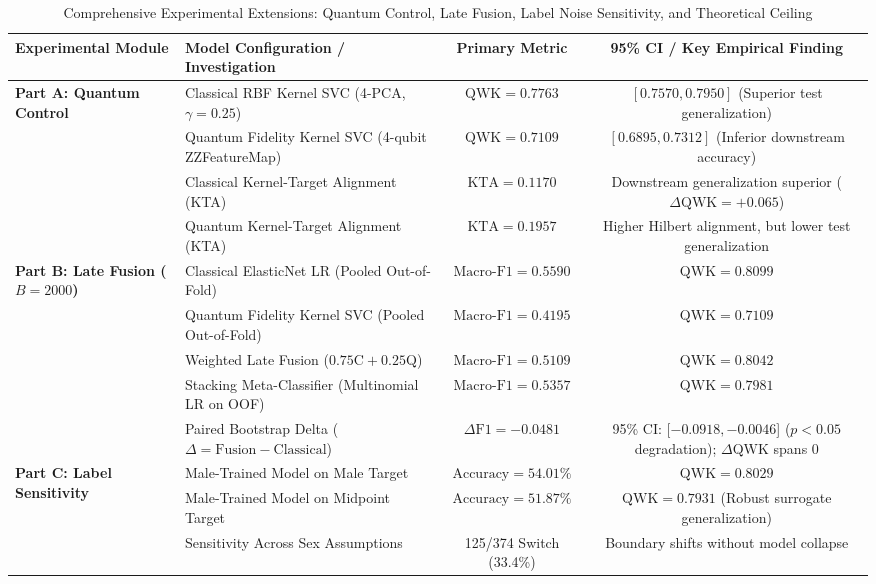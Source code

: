 \documentclass{IEEEtran}
\begin{document}
\begin{table}[t]
\centering
\caption{Comprehensive Experimental Extensions: Quantum Control, Late Fusion, Label Noise Sensitivity, and Theoretical Ceiling}
\label{tab:extensions_benchmark}
\renewcommand{\arraystretch}{1.04}
\footnotesize
\begin{tabularx}{\textwidth}{lXcc}
\toprule
\textbf{Experimental Module} & \textbf{Model Configuration / Investigation} & \textbf{Primary Metric} & \textbf{95\% CI / Key Empirical Finding} \\
\midrule
\multirow{4}{*}{\textbf{Part A: Quantum Control}} 
& Classical RBF Kernel SVC (4-PCA, $\gamma = 0.25$) & $\text{QWK} = \mathbf{0.7763}$ & $[0.7570, 0.7950]$ (Superior test generalization) \\
& Quantum Fidelity Kernel SVC (4-qubit ZZFeatureMap) & $\text{QWK} = 0.7109$ & $[0.6895, 0.7312]$ (Inferior downstream accuracy) \\
& Classical Kernel-Target Alignment (KTA) & $\text{KTA} = 0.1170$ & Downstream generalization superior ($\Delta\text{QWK} = +0.065$) \\
& Quantum Kernel-Target Alignment (KTA) & $\text{KTA} = \mathbf{0.1957}$ & Higher Hilbert alignment, but lower test generalization \\
\midrule
\multirow{5}{*}{\textbf{Part B: Late Fusion ($B = 2000$)}} 
& Classical ElasticNet LR (Pooled Out-of-Fold) & $\text{Macro-F1} = \mathbf{0.5590}$ & $\text{QWK} = \mathbf{0.8099}$ \\
& Quantum Fidelity Kernel SVC (Pooled Out-of-Fold) & $\text{Macro-F1} = 0.4195$ & $\text{QWK} = 0.7109$ \\
& Weighted Late Fusion ($0.75\text{C} + 0.25\text{Q}$) & $\text{Macro-F1} = 0.5109$ & $\text{QWK} = 0.8042$ \\
& Stacking Meta-Classifier (Multinomial LR on OOF) & $\text{Macro-F1} = 0.5357$ & $\text{QWK} = 0.7981$ \\
& Paired Bootstrap Delta ($\Delta = \text{Fusion} - \text{Classical}$) & $\Delta\text{F1} = -0.0481$ & 95\% CI: [$-0.0918, -0.0046$] ($p < 0.05$ degradation); $\Delta\text{QWK}$ spans 0 \\
\midrule
\multirow{4}{*}{\textbf{Part C: Label Sensitivity}} 
& Male-Trained Model on Male Target & $\text{Accuracy} = 54.01\%$ & $\text{QWK} = 0.8029$ \\
& Male-Trained Model on Midpoint Target & $\text{Accuracy} = 51.87\%$ & $\text{QWK} = \mathbf{0.7931}$ (Robust surrogate generalization) \\
& Sensitivity Across Sex Assumptions & 125/374 Switch (33.4\%) & Boundary shifts without model collapse \\

\end{tabularx}
\end{table}
\end{document}
